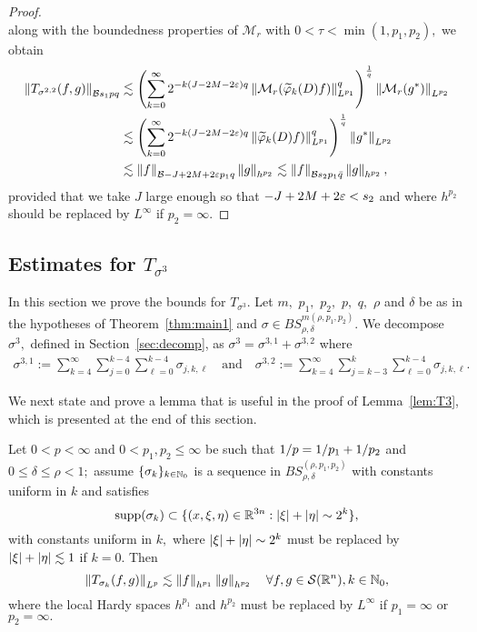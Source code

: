 \begin{proof}
$$$$
along with  the boundedness properties of $\mathcal{M}_r$ with $0<\tau<\min(1,p_1,p_2),$ we obtain
\begin{align*}
\left\|T_{\sigma^{2,2}}(f,g)\right\|_{\mathcal{B}{s_1}{p}{q}} & \lesssim \left( \sum\limits_{k=0}^\infty 2^{-k  (J-2M -2\varepsilon)q} \left\|\mathcal{M}_r(\widetilde{\varphi}_k(D)f)\right\|_{L^{p_1}}^q  \right)^\frac{1}{q}\left\|\mathcal{M}_r(g^*)\right\|_{L^{p_2}}\\
& \lesssim \left( \sum\limits_{k=0}^\infty 2^{-k  (J-2M -2\varepsilon)q} \left\|\widetilde{\varphi}_k(D)f)\right\|_{L^{p_1}}^q  \right)^\frac{1}{q} \left\|g^*\right\|_{L^{p_2}}\\
& \lesssim \left\|f\right\|_{\mathcal{B}{-J +2M +2\varepsilon}{p_1}{q}} \left\|g\right\|_{h^{p_2}} \lesssim  \left\|f\right\|_{\mathcal{B}{s_2}{p_1}{\bar{q}}} \left\|g\right\|_{h^{p_2}},
\end{align*}
provided that we take $J$ large enough so that $-J +2M +2\varepsilon < s_2$ and where $h^{p_2}$ should be replaced by $L^\infty$ if $p_2=\infty.$
\end{proof}




\subsection{Estimates for $T_{\sigma^3}$}

In this section we prove the bounds for $T_{\sigma^3}$. Let $m,$ $p_1,$ $p_2,$ $p,$ $q,$   $\rho$ and $\delta$ be as in the hypotheses of Theorem~\ref{thm:main1} and $\sigma\in BS^{m(\rho,p_1,p_2)}_{\rho,\delta}.$ We decompose $\sigma^3,$ defined in Section~\ref{sec:decomp}, as $\sigma^3=\sigma^{3,1}+\sigma^{3,2}$ where
\begin{align*}
\sigma^{3,1}:=  \sum\limits_{k=4}^\infty \sum\limits_{j=0}^{k-4} \sum\limits_{\ell =0}^{k-4} \sigma_{j,k,\ell}\quad \text{and}\quad \sigma^{3,2}:= \sum\limits_{k=4}^\infty \sum\limits_{j=k-3}^k \sum\limits_{\ell =0}^{k-4} \sigma_{j,k,\ell}.
\end{align*}



We next state and prove a lemma that is useful in the proof of Lemma~\ref{lem:T3}, which is presented at the end of this section.

\begin{lemma}\label{lem:Tsk:bound} Let $0<p<\infty$ and $0<p_1,p_2\le \infty$  be such that $1/p=1/p_1+1/p_2$ and $0\le \delta\le \rho<1;$ assume $\{\sigma_k\}_{k\in \mathbb{N}_0}$ is a sequence in $BS^{(\rho,p_1,p_2)}_{\rho,\delta}$  with constants uniform in $k$ and satisfies 
\begin{equation*}
{\rm{supp}}(\sigma_k)\subset \{(x,\xi,\eta)\in \mathbb{R}^{3n}: \left\vert \xi \right\vert+\left\vert \eta \right\vert\sim 2^k\},
\end{equation*}
with constants uniform in $k,$  where  $\left\vert \xi \right\vert+\left\vert \eta \right\vert\sim 2^k$ must be replaced by $\left\vert \xi \right\vert+\left\vert \eta \right\vert\lesssim 1$ if $k=0.$
Then 
\begin{equation*}
\left\|T_{\sigma_k}(f,g)\right\|_{L^p}\lesssim \left\|f\right\|_{h^{p_1}}\left\|g\right\|_{h^{p_2}}\quad \forall f,g\in{\mathcal{S}}({{\mathbb R}^n}),k\in\mathbb{N}_0,
\end{equation*}
where the local Hardy spaces $h^{p_1}$ and $h^{p_2}$ must be replaced by $L^\infty$ if $p_1=\infty$ or $p_2=\infty.$
\end{lemma}

